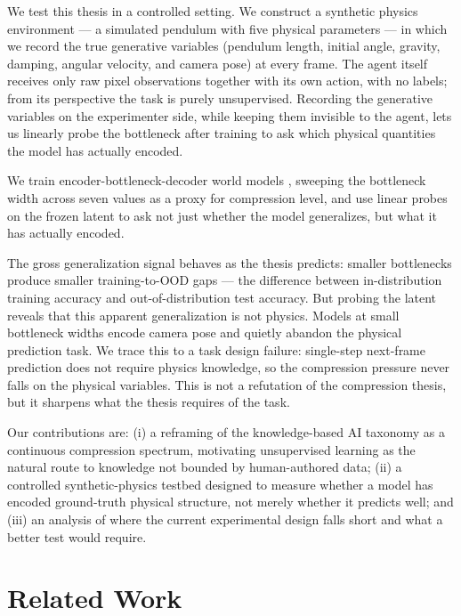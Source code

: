 \documentclass[letterpaper]{article} %
\begin{document}
We test this thesis in a controlled setting. We construct a synthetic physics environment --- a simulated pendulum with five physical parameters --- in which we record the true generative variables (pendulum length, initial angle, gravity, damping, angular velocity, and camera pose) at every frame. The agent itself receives only raw pixel observations together with its own action, with no labels; from its perspective the task is purely unsupervised. Recording the generative variables on the experimenter side, while keeping them invisible to the agent, lets us linearly probe the bottleneck after training to ask which physical quantities the model has actually encoded.

We train encoder-bottleneck-decoder world models \citep{ha2018world}, sweeping the bottleneck width across seven values as a proxy for compression level, and use linear probes \citep{alain2016understanding} on the frozen latent to ask not just whether the model generalizes, but what it has actually encoded.

The gross generalization signal behaves as the thesis predicts: smaller bottlenecks produce smaller training-to-OOD gaps --- the difference between in-distribution training accuracy and out-of-distribution test accuracy. But probing the latent reveals that this apparent generalization is not physics. Models at small bottleneck widths encode camera pose and quietly abandon the physical prediction task. We trace this to a task design failure: single-step next-frame prediction does not require physics knowledge, so the compression pressure never falls on the physical variables. This is not a refutation of the compression thesis, but it sharpens what the thesis requires of the task.

Our contributions are: (i) a reframing of the knowledge-based AI taxonomy as a continuous compression spectrum, motivating unsupervised learning as the natural route to knowledge not bounded by human-authored data; (ii) a controlled synthetic-physics testbed designed to measure whether a model has encoded ground-truth physical structure, not merely whether it predicts well; and (iii) an analysis of where the current experimental design falls short and what a better test would require.

\section{Related Work}
\end{document}
